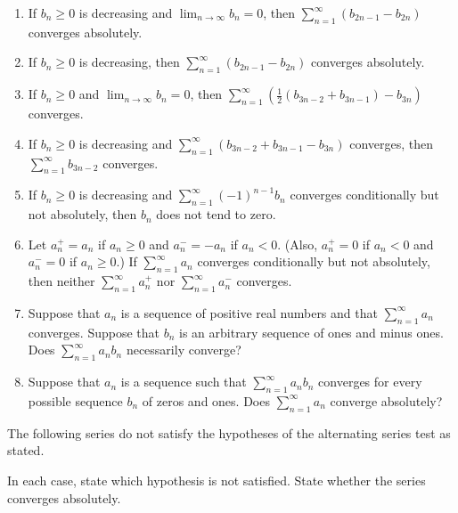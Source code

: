 \documentclass{exercises}
\begin{document}
\begin{enumerate}[resume]
\item If $b_{n}\ge0$ is decreasing and $\lim_{n\to \infty}b_{n}=0$, then $\sum_{n=1}^{\infty}(b_{2n-1}-b_{2n})$ converges absolutely.
\item If $b_{n}\ge0$ is decreasing, then $\sum_{n=1}^{\infty}(b_{2n-1}-b_{2n})$ converges absolutely.
\item If $b_{n}\ge0$ and $\lim_{n\to \infty}b_{n}=0$, then $\sum_{n=1}^{\infty}(\frac{1}{2}(b_{3n-2}+b_{3n-1})-b_{3n})$ converges.
\item If $b_{n}\ge0$ is decreasing and $\sum_{n=1}^{\infty}(b_{3n-2}+b_{3n-1}-b_{3n})$ converges, then $\sum_{n=1}^{\infty}b_{3n-2}$ converges.
\item If $b_{n}\ge0$ is decreasing and $\sum_{n=1}^{\infty}{(-1)}^{n-1}b_{n}$ converges conditionally but not absolutely, then $b_{n}$ does not tend to zero.
\item Let $a_{n}^{+}=a_{n}$ if $a_{n}\ge0$ and $a_{n}^{-}=-a_{n}$ if $a_{n}<0$. (Also, $a_{n}^{+}=0$ if $a_{n}<0$ and $a_{n}^{-}=0$ if $a_{n}\ge0$.) If $\sum_{n=1}^{\infty}a_{n}$ converges conditionally but not absolutely, then neither $\sum_{n=1}^{\infty}a_{n}^{+}$ nor $\sum_{n=1}^{\infty}a_{n}^{-}$ converges.
\item Suppose that $a_{n}$ is a sequence of positive real numbers and that $\sum_{n=1}^{\infty}a_{n}$ converges. Suppose that $b_{n}$ is an arbitrary sequence of ones and minus ones. Does $\sum_{n=1}^{\infty}a_{n}b_{n}$ necessarily converge?
\item Suppose that $a_{n}$ is a sequence such that $\sum_{n=1}^{\infty}a_{n}b_{n}$ converges for every possible sequence $b_{n}$ of zeros and ones. Does $\sum_{n=1}^{\infty}a_{n}$ converge absolutely?
\end{enumerate}

The following series do not satisfy the hypotheses of the alternating series test as stated.


In each case, state which hypothesis is not satisfied. State whether the series converges absolutely.
\end{document}
